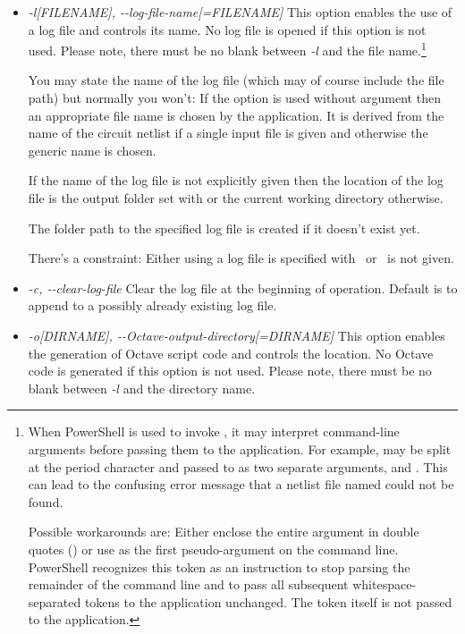 \begin{itemize}
  \item \emph{-l[FILENAME], -{}-log-file-name[=FILENAME]} This option
    enables the use of a log file and controls its name. No log file is
    opened if this option is not used. Please note, there must be no blank
    between \emph{-l} and the file name.\footnote{%
      When PowerShell is used to invoke \linnet{}, it may interpret
    command-line arguments before passing them to the application. For
    example,  may be split at the period character
    and passed to \linnet{} as two separate arguments, 
    and . This can lead to the confusing error message that a
    netlist file named  could not be found.
  
    Possible workarounds are: Either enclose the entire argument in double
    quotes () or use \code{--\%} as the first
    pseudo-argument on the command line. PowerShell recognizes this token
    as an instruction to stop parsing the remainder of the command line
    and to pass all subsequent whitespace-separated tokens to the
    application unchanged. The token \code{--\%} itself is not passed to
    the application.}

    You may state the name of the log file (which may of course include
    the file path) but normally you won't: If the option is used without
    argument  then an appropriate file name is chosen by
    the application. It is derived from the name of the circuit netlist if
    a single input file is given and otherwise the generic name
     is chosen.

    If the name of the log file is not explicitly given then the location
    of the log file is the output folder set with  or the current
    working directory otherwise.

    The folder path to the specified log file is created if it doesn't
    exist yet.
    
    There's a constraint: Either using a log file is specified
    with~ or~ is not given.

  \item \emph{-c, -{}-clear-log-file}
    Clear the log file at the beginning of operation. Default is to append
    to a possibly already existing log file.

  \item \emph{-o[DIRNAME], -{}-Octave-output-directory[=DIRNAME]}
    This option enables the generation of Octave script code and controls
    the location. No Octave code is generated if this option is not used.
    Please note, there must be no blank between \emph{-l} and the
    directory name.


\end{itemize}
